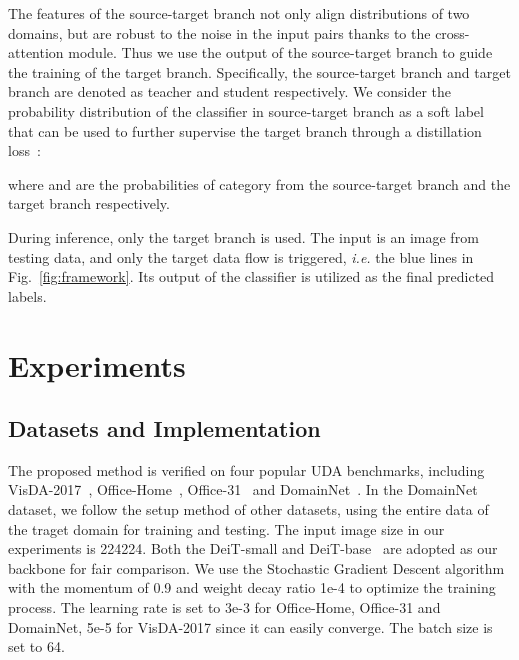 \documentclass[dvipsnames, svgnames, x11names, table]{article} \usepackage{iclr2022_conference,times}
\begin{document}
\begin{spacing}{1.0}
The features of the source-target branch not only align distributions of two domains, but are robust to the noise in the input pairs thanks to the cross-attention module.
Thus we use the output of the source-target branch to guide the training of the target branch. Specifically, the source-target branch and target branch are denoted as teacher and student respectively. We consider the probability distribution of the classifier in source-target branch as a soft label that can be used to further supervise the target branch through a distillation loss~\citep{hinton2015distilling}:

where  and  are the probabilities of category  from the source-target branch and the target branch respectively.

During inference, only the target branch is used. The input is an image from testing data, and only the target data flow is triggered, \textit{i.e.} the blue lines in Fig.~\ref{fig:framework}. Its output of the classifier is utilized as the final predicted labels.





\section{Experiments}

\subsection{Datasets and Implementation}
The proposed method is verified on four popular UDA benchmarks, including VisDA-2017~\citep{visda2017}, Office-Home~\citep{venkateswara2017deep},
Office-31~\citep{saenko2010adapting}
and DomainNet~\citep{peng2019moment}.
In the DomainNet dataset, we follow the setup method of other datasets, using the entire data of the traget domain for training and testing.
The input image size in our experiments is 224224. Both the DeiT-small and DeiT-base~\citep{touvron2021training} are adopted as our backbone for fair comparison.
We use the Stochastic Gradient Descent algorithm with the momentum of 0.9 and weight decay ratio 1e-4 to optimize the training process.
The learning rate is set to 3e-3 for Office-Home, Office-31 and DomainNet, 5e-5 for VisDA-2017 since it can easily converge. The batch size is set to 64. 





\end{spacing}
\end{document}
